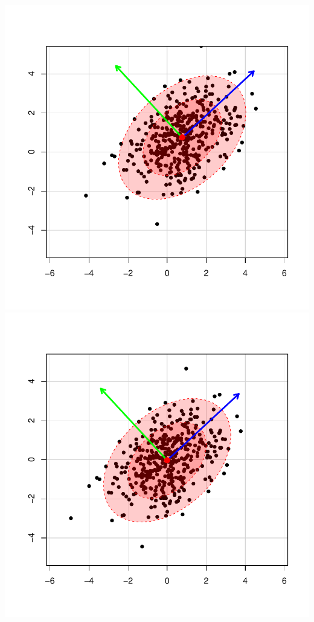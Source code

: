 \documentclass[landscape,footrule]{foils}
\begin{document}
\begin{center}
\includegraphics[scale=0.45]{initial-distribution-ii.pdf}
\includegraphics[scale=0.45]{translated-distribution-ii.pdf}

\end{center}
\end{document}
